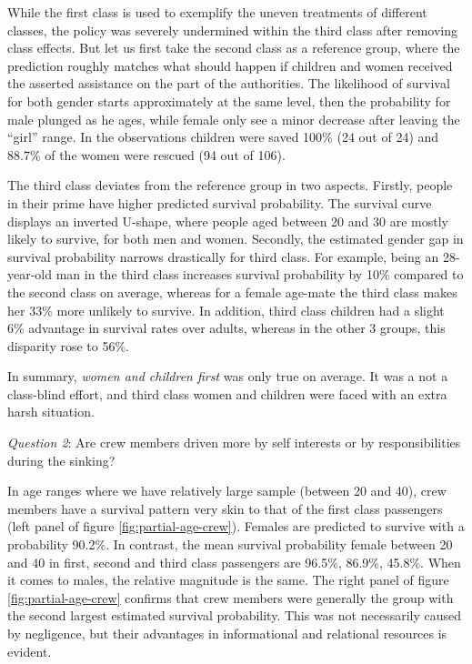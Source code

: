 \documentclass[]{interact}
\theoremstyle{plain}%
\theoremstyle{definition}
\theoremstyle{remark}
\begin{document}
While the first class is used to exemplify the uneven treatments of different classes, the policy was severely undermined within the third class after removing class effects. But let us first take the second class as a reference group, where the prediction roughly matches what should happen if children and women received the asserted assistance
on the part of the authorities. The likelihood of survival for both gender starts approximately at the same level, then the probability for male plunged as he ages, while female only see a minor decrease after leaving the ``girl'' range. In the observations children were saved 100\% (24 out of 24) and 88.7\% of the women were rescued (94 out of 106).

The third class deviates from the reference group in two aspects. Firstly, people in their prime have higher predicted survival probability. The survival curve displays an inverted U-shape, where people aged between 20 and 30 are mostly likely to survive, for both men and women. Secondly, the estimated gender gap in survival probability narrows drastically for third class. For example, being an 28-year-old man in the third class increases survival probability by 10\% compared to the second class on average, whereas for a female age-mate the third class makes her 33\% more unlikely to survive. In addition, third class children had a slight 6\% advantage in survival rates over adults, whereas in the other 3 groups, this disparity rose to 56\%.

In summary, \emph{women and children first} was only true on average. It was a not a class-blind effort, and third class women and children were faced with an extra harsh situation.

\hfill\break

\emph{Question 2}: Are crew members driven more by self interests or by responsibilities during the sinking?

In age ranges where we have relatively large sample (between 20 and 40), crew members have a survival pattern very skin to that of the first class passengers (left panel of figure \ref{fig:partial-age-crew}). Females are predicted to survive with a probability 90.2\%. In contrast, the mean survival probability female between 20 and 40 in first, second and third class passengers are 96.5\%, 86.9\%, 45.8\%. When it comes to males, the relative magnitude is the same. The right panel of figure \ref{fig:partial-age-crew} confirms that crew members were generally the group with the second largest estimated survival probability. This was not necessarily caused by negligence, but their advantages in informational and relational resources is evident.
\end{document}
